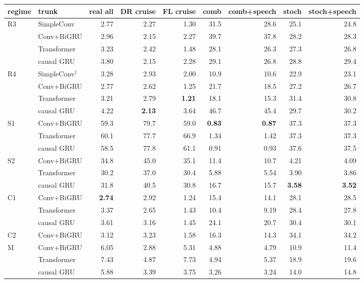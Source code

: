 \begin{tabular}{@{}llrrrrrrr@{}}
\toprule
regime & trunk & real all & DR cruise & FL cruise & comb & comb+speech & stoch & stoch+speech \\
\midrule
\multirow{4}{*}{R3} & SimpleConv & 2.77 & 2.27 & 1.30 & 31.5 & 28.6 & 25.1 & 24.8 \\
 & Conv+BiGRU & 2.96 & 2.15 & 2.27 & 39.7 & 37.8 & 28.2 & 28.3 \\
 & Transformer & 3.23 & 2.42 & 1.48 & 28.1 & 26.3 & 27.3 & 26.8 \\
 & causal GRU & 3.80 & 2.15 & 2.28 & 29.1 & 26.8 & 28.8 & 29.4 \\
\midrule
\multirow{4}{*}{R4} & SimpleConv$^\dagger$ & 3.28 & 2.93 & 2.00 & 10.9 & 10.6 & 22.9 & 23.1 \\
 & Conv+BiGRU & 2.77 & 2.62 & 1.25 & 21.7 & 18.5 & 27.2 & 26.7 \\
 & Transformer & 3.21 & 2.79 & \textbf{1.21} & 18.1 & 15.3 & 31.4 & 30.8 \\
 & causal GRU & 4.22 & \textbf{2.13} & 3.64 & 46.7 & 45.4 & 29.7 & 30.2 \\
\midrule
\multirow{3}{*}{S1} & Conv+BiGRU & 59.3 & 79.7 & 59.0 & \textbf{0.83} & \textbf{0.87} & 37.3 & 37.3 \\
 & Transformer & 60.1 & 77.7 & 66.9 & 1.34 & 1.42 & 37.3 & 37.3 \\
 & causal GRU & 58.5 & 77.8 & 61.1 & 0.91 & 0.93 & 37.6 & 37.5 \\
\midrule
\multirow{3}{*}{S2} & Conv+BiGRU & 34.8 & 45.0 & 35.1 & 11.4 & 10.7 & 4.21 & 4.09 \\
 & Transformer & 30.2 & 37.0 & 30.4 & 5.88 & 5.54 & 3.90 & 3.86 \\
 & causal GRU & 31.8 & 40.5 & 30.8 & 16.7 & 15.7 & \textbf{3.58} & \textbf{3.52} \\
\midrule
\multirow{3}{*}{C1} & Conv+BiGRU & \textbf{2.74} & 2.92 & 1.24 & 15.4 & 14.1 & 28.1 & 28.5 \\
 & Transformer & 3.37 & 2.65 & 1.43 & 10.4 & 9.19 & 28.4 & 27.8 \\
 & causal GRU & 3.61 & 3.16 & 1.45 & 24.1 & 20.7 & 30.4 & 30.1 \\
\midrule
C2 & Conv+BiGRU & 3.12 & 3.23 & 1.58 & 16.3 & 14.3 & 34.1 & 34.2 \\
\midrule
\multirow{3}{*}{M} & Conv+BiGRU & 6.05 & 2.88 & 5.31 & 4.88 & 4.79 & 10.9 & 11.4 \\
 & Transformer & 7.43 & 4.87 & 7.73 & 4.94 & 5.37 & 18.9 & 19.6 \\
 & causal GRU & 5.88 & 3.39 & 3.75 & 3.26 & 3.24 & 14.0 & 14.8 \\
\bottomrule
\end{tabular}
